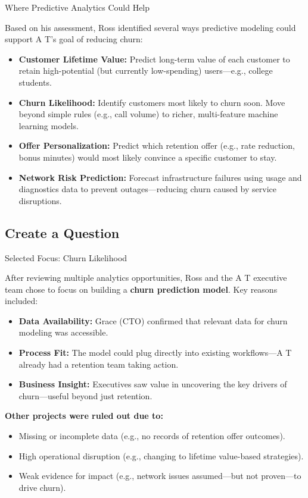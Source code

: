 \documentclass[aspectratio=169,xcolor=dvipsnames]{beamer}
\begin{document}
\begin{frame}{Where Predictive Analytics Could Help}

Based on his assessment, Ross identified several ways predictive modeling could support A T’s goal of reducing churn:

\begin{itemize}
  \item \textbf{Customer Lifetime Value:} Predict long-term value of each customer to retain high-potential (but currently low-spending) users—e.g., college students.
  
  \item \textbf{Churn Likelihood:} Identify customers most likely to churn soon. Move beyond simple rules (e.g., call volume) to richer, multi-feature machine learning models.
  
  \item \textbf{Offer Personalization:} Predict which retention offer (e.g., rate reduction, bonus minutes) would most likely convince a specific customer to stay.
  
  \item \textbf{Network Risk Prediction:} Forecast infrastructure failures using usage and diagnostics data to prevent outages—reducing churn caused by service disruptions.
\end{itemize}

\end{frame}
\subsection{Create a Question}
\begin{frame}{Selected Focus: Churn Likelihood}

After reviewing multiple analytics opportunities, Ross and the A T executive team chose to focus on building a \textbf{churn prediction model}. Key reasons included:

\begin{itemize}
  \item \textbf{Data Availability:} Grace (CTO) confirmed that relevant data for churn modeling was accessible.
  \item \textbf{Process Fit:} The model could plug directly into existing workflows—A T already had a retention team taking action.
  \item \textbf{Business Insight:} Executives saw value in uncovering the key drivers of churn—useful beyond just retention.
\end{itemize}

\textbf{Other projects were ruled out due to:}
\begin{itemize}
  \item Missing or incomplete data (e.g., no records of retention offer outcomes).
  \item High operational disruption (e.g., changing to lifetime value-based strategies).
  \item Weak evidence for impact (e.g., network issues assumed—but not proven—to drive churn).
\end{itemize}

\end{frame}
\end{document}
